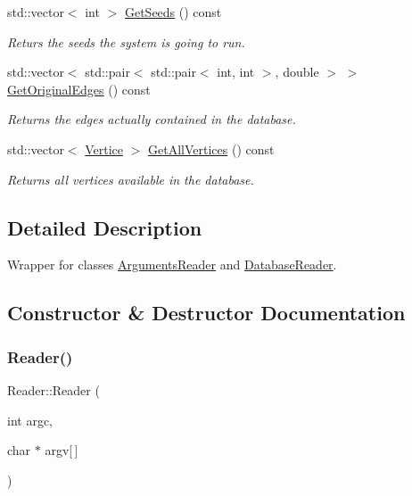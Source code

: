 \begin{DoxyCompactItemize}
\mbox{\label{classReader_a9b232676631a30634a80a8dfc72b723f}} 
std\+::vector$<$ int $>$ \hyperlink{classReader_a9b232676631a30634a80a8dfc72b723f}{Get\+Seeds} () const
\begin{DoxyCompactList}\small\item\em Returs the seeds the system is going to run. \end{DoxyCompactList}\item 
\mbox{\label{classReader_af2cd73d6b782dea86bf8129edeea7f70}} 
std\+::vector$<$ std\+::pair$<$ std\+::pair$<$ int, int $>$, double $>$ $>$ \hyperlink{classReader_af2cd73d6b782dea86bf8129edeea7f70}{Get\+Original\+Edges} () const
\begin{DoxyCompactList}\small\item\em Returns the edges actually contained in the database. \end{DoxyCompactList}\item 
\mbox{\label{classReader_a2939bfcbbc96aebd5fc074ec3f7f5987}} 
std\+::vector$<$ \hyperlink{classVertice}{Vertice} $>$ \hyperlink{classReader_a2939bfcbbc96aebd5fc074ec3f7f5987}{Get\+All\+Vertices} () const
\begin{DoxyCompactList}\small\item\em Returns all vertices available in the database. \end{DoxyCompactList}\end{DoxyCompactItemize}


\subsection{Detailed Description}
Wrapper for classes \hyperlink{classArgumentsReader}{Arguments\+Reader} and \hyperlink{classDatabaseReader}{Database\+Reader}. 

\subsection{Constructor \& Destructor Documentation}
\mbox{\label{classReader_a129e7447005ec95a13d937ad294f1d14}} 
\subsubsection{\texorpdfstring{Reader()}{Reader()}}
{\footnotesize\ttfamily Reader\+::\+Reader (\begin{DoxyParamCaption}\item[{int}]{argc,  }\item[{char $\ast$}]{argv\mbox{[}$\,$\mbox{]} }\end{DoxyParamCaption})}



